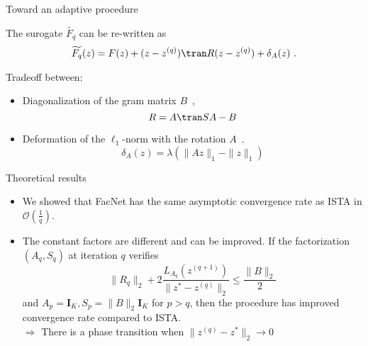\documentclass[prez_tpt]{subfiles}
\begin{document}
\begin{frame}{Toward an adaptive procedure}

	The surogate $\widetilde{F_q}$ can be re-written as
	\[
		\widetilde{F_q}(z) = F(z) + (z-z^{(q)})\tran R(z-z^{(q)}) + \delta_A(z)~.
	\]


	Tradeoff between:\\[.3em]
	\begin{itemize}\itemsep1em
		\item Diagonalization of the gram matrix $B$~,
		\[ R = A\tran SA - B\]
		\item Deformation of the $\ell_1$-norm with the rotation $A$~.
		\[ \delta_A(z) = \lambda\left(\|Az\|_1-\|z\|_1\right) \]
	\end{itemize}
\end{frame}

%



\begin{frame}{Theoretical results}
    \begin{itemize}\itemsep1em
		\item We showed that FacNet has the same asymptotic convergence rate as ISTA
		in $\mathcal O(\tfrac{1}{q})$.
		\item The constant factors are different and can be improved.
		If the factorization $(A_q, S_q)$ at iteration $q$  verifies
			\[
				\|R_q\|_2 + 2 \frac{L_{A_q}(z^{(q+1)})}{\|z^*-z^{(q)}\|_2} \le \frac{\|B\|_2}{2}
			\]
			and $A_p = \pmb I_K, S_p = \|B\|_2\pmb I_K$ for $p > q$, then the procedure has
			improved convergence rate compared to ISTA.\\[1em]
			{{$\Rightarrow$}} There is a phase transition when
			 $\|z^{(q)} - z^*\|_2 \to 0$
	\end{itemize}
\end{frame}
\end{document}
